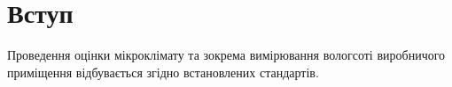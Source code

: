 \chapter*{Вступ}

Проведення оцінки мікроклімату та зокрема вимірювання вологсоті виробничого приміщення відбувається
згідно встановлених стандартів.


